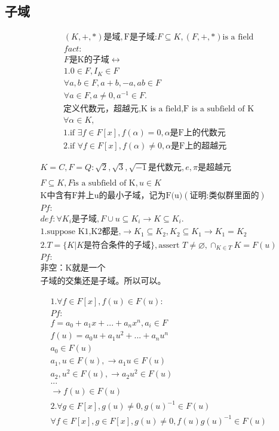 \documentclass[12pt, a4paper]{article}  %
\begin{document}
\subsection{子域}
\begin{align}
    &(K,+,*)\text{是域},\text{F是子域:}F\subseteq K,(F,+,*)\text{is a field}\\
    &fact:\\
    &F\text{是K的子域}\leftrightarrow\\
    &1.0\in F,I_K\in F\\
    &\forall a,b\in F,a+b,-a,ab\in F\\
    &\forall a\in F,a\neq 0,a^{-1}\in F.
\end{align}
\begin{align}
    &\text{定义代数元，超越元,K is a field,F is a subfield of K}\\
    &\forall \alpha \in K,\\
    &1.\text{if }\exists f\in F[x],f(\alpha)=0,\alpha\text{是F上的代数元}\\
    &2.\text{if }\forall f\in F[x],f(\alpha)\neq 0,\alpha\text{是F上的超越元}
\end{align}

\begin{align}
    &K=C,F=Q:\sqrt{2},\sqrt{3},\sqrt{-1}\text{是代数元},e,\pi\text{是超越元}\\
    &\\
    &F\subseteq K,F\text{is a subfield of K},u\in K\\
    &\text{K中含有F并上{u}的最小子域，记为F(u)}(\text{证明:类似群里面的})\\
    &Pf:\\
    &def:\forall K_i\text{是子域},F\cup {u}\subseteq K_i\rightarrow K\subseteq K_i.\\
    &1.\text{suppose K1,K2都是,}\rightarrow K_1\subseteq K_2, K_2\subseteq K_1\rightarrow K_1=K_2\\
    &2.T=\{K|K\text{是符合条件的子域}\},\text{assert }T\neq \varnothing,\cap _{K \in T} K=F(u)\\
    &Pf:\\
    &\text{非空：K就是一个}\\
    &\text{子域的交集还是子域。所以可以。}
\end{align}


\begin{align}
    &1.\forall f\in F[x],f(u)\in F(u):\\
    &Pf:\\
    &f=a_0+a_1x+...+a_nx^n,a_i\in F\\
    &f(u)=a_0u+a_1u^2+...+a_nu^n\\
    &a_0\in F(u)\\
    &a_1,u\in F(u),\rightarrow a_1u\in F(u)\\
    &a_2,u^2\in F(u),\rightarrow a_2u^2\in F(u)\\
    &...\\
    &\rightarrow f(u)\in F(u)\\
    &2.\forall g\in F[x],g(u)\neq 0,g(u)^{-1}\in F(u)\\
    &\forall f\in F[x],g\in F[x],g(u)\neq 0,f(u)g(u)^{-1}\in F(u)
\end{align}
\end{document}
